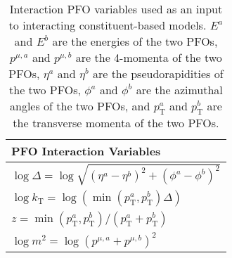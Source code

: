 \begin{table}[!htb]
    \centering
    \caption{Interaction PFO variables used as an input to interacting constituent-based models. $E^a$ and $E^b$ are the energies of the two PFOs, $p^{\mu, a}$ and $p^{\mu, b}$ are the 4-momenta of the two PFOs, $\eta^a$ and $\eta^b$ are the pseudorapidities of the two PFOs, $\phi^a$ and $\phi^b$ are the azimuthal angles of the two PFOs, and $p_\mathrm{T}^a$ and $p_\mathrm{T}^b$ are the transverse momenta of the two PFOs. \cite{part}}
    \label{tab:pfo_interaction_variables}
    \begin{tabular}{l}
    \toprule
        PFO Interaction Variables \\
    \midrule
        $\log \Delta = \log{\sqrt{(\eta^a - \eta^b)^2 + (\phi^a - \phi^b)^2}}$ \\
        $\log k_\mathrm{T} = \log{(\min{(p_\mathrm{T}^a, p_\mathrm{T}^b)} \Delta)}$ \\
        $z = \min{(p_\mathrm{T}^a, p_\mathrm{T}^b)}/(p_\mathrm{T}^a + p_\mathrm{T}^b)$ \\
        $\log m^2 = \log{(p^{\mu, a} + p^{\mu, b})^2}$ \\
    \bottomrule
    \end{tabular}
\end{table}
    
